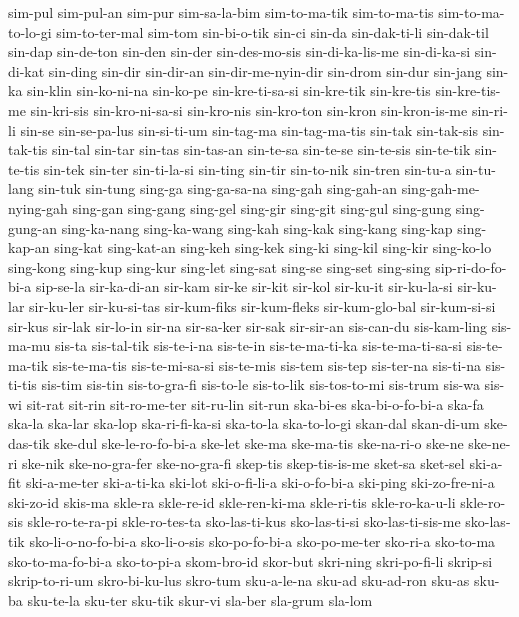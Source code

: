 {sim-pul sim-pul-an sim-pur sim-sa-la-bim sim-to-ma-tik sim-to-ma-tis
sim-to-ma-to-lo-gi sim-to-ter-mal sim-tom sin-bi-o-tik sin-ci sin-da
sin-dak-ti-li sin-dak-til sin-dap sin-de-ton sin-den sin-der
sin-des-mo-sis sin-di-ka-lis-me sin-di-ka-si sin-di-kat sin-ding sin-dir
sin-dir-an sin-dir-me-nyin-dir sin-drom sin-dur sin-jang sin-ka sin-klin
sin-ko-ni-na sin-ko-pe sin-kre-ti-sa-si sin-kre-tik sin-kre-tis
sin-kre-tis-me sin-kri-sis sin-kro-ni-sa-si sin-kro-nis sin-kro-ton
sin-kron sin-kron-is-me sin-ri-li sin-se sin-se-pa-lus sin-si-ti-um
sin-tag-ma sin-tag-ma-tis sin-tak sin-tak-sis sin-tak-tis sin-tal sin-tar
sin-tas sin-tas-an sin-te-sa sin-te-se sin-te-sis sin-te-tik sin-te-tis
sin-tek sin-ter sin-ti-la-si sin-ting sin-tir sin-to-nik sin-tren sin-tu-a
sin-tu-lang sin-tuk sin-tung sing-ga sing-ga-sa-na sing-gah sing-gah-an
sing-gah-me-nying-gah sing-gan sing-gang sing-gel sing-gir sing-git
sing-gul sing-gung sing-gung-an sing-ka-nang sing-ka-wang sing-kah
sing-kak sing-kang sing-kap sing-kap-an sing-kat sing-kat-an sing-keh
sing-kek sing-ki sing-kil sing-kir sing-ko-lo sing-kong sing-kup sing-kur
sing-let sing-sat sing-se sing-set sing-sing sip-ri-do-fo-bi-a sip-se-la
sir-ka-di-an sir-kam sir-ke sir-kit sir-kol sir-ku-it sir-ku-la-si
sir-ku-lar sir-ku-ler sir-ku-si-tas sir-kum-fiks sir-kum-fleks
sir-kum-glo-bal sir-kum-si-si sir-kus sir-lak sir-lo-in sir-na sir-sa-ker
sir-sak sir-sir-an sis-can-du sis-kam-ling sis-ma-mu sis-ta sis-tal-tik
sis-te-i-na sis-te-in sis-te-ma-ti-ka sis-te-ma-ti-sa-si sis-te-ma-tik
sis-te-ma-tis sis-te-mi-sa-si sis-te-mis sis-tem sis-tep sis-ter-na
sis-ti-na sis-ti-tis sis-tim sis-tin sis-to-gra-fi sis-to-le sis-to-lik
sis-tos-to-mi sis-trum sis-wa sis-wi sit-rat sit-rin sit-ro-me-ter
sit-ru-lin sit-run ska-bi-es ska-bi-o-fo-bi-a ska-fa ska-la ska-lar
ska-lop ska-ri-fi-ka-si ska-to-la ska-to-lo-gi skan-dal skan-di-um
ske-das-tik ske-dul ske-le-ro-fo-bi-a ske-let ske-ma ske-ma-tis
ske-na-ri-o ske-ne ske-ne-ri ske-nik ske-no-gra-fer ske-no-gra-fi skep-tis
skep-tis-is-me sket-sa sket-sel ski-a-fit ski-a-me-ter ski-a-ti-ka ski-lot
ski-o-fi-li-a ski-o-fo-bi-a ski-ping ski-zo-fre-ni-a ski-zo-id skis-ma
skle-ra skle-re-id skle-ren-ki-ma skle-ri-tis skle-ro-ka-u-li skle-ro-sis
skle-ro-te-ra-pi skle-ro-tes-ta sko-las-ti-kus sko-las-ti-si
sko-las-ti-sis-me sko-las-tik sko-li-o-no-fo-bi-a sko-li-o-sis
sko-po-fo-bi-a sko-po-me-ter sko-ri-a sko-to-ma sko-to-ma-fo-bi-a
sko-to-pi-a skom-bro-id skor-but skri-ning skri-po-fi-li skrip-si
skrip-to-ri-um skro-bi-ku-lus skro-tum sku-a-le-na sku-ad sku-ad-ron
sku-as sku-ba sku-te-la sku-ter sku-tik skur-vi sla-ber sla-grum sla-lom
}
